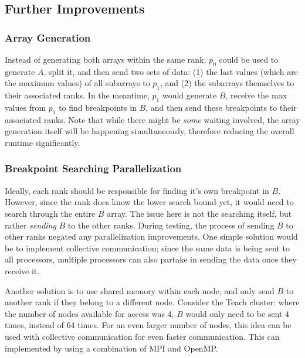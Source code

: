 \documentclass[12pt]{article}
\begin{document}
{    \subsection{Further Improvements}
    \subsubsection{Array Generation}
    Instead of generating both arrays within the same rank, $p_0$ could be used to generate $A$, split it, and then send two sets of data: (1) the last values (which are the maximum values) of all subarrays to $p_1$, and (2) the subarrays themselves to their associated ranks. In the meantime, $p_1$ would generate $B$, receive the max values from $p_1$ to find breakpoints in $B$, and then send these breakpoints to their associated ranks. Note that while there might be \emph{some} waiting involved, the array generation itself will be happening simultaneously, therefore reducing the overall runtime significantly.

    \subsubsection{Breakpoint Searching Parallelization}
    Ideally, each rank should be responsible for finding it's own breakpoint in $B$. However, since the rank does know the lower search bound yet, it would need to search through the entire $B$ array. The issue here is not the searching itself, but rather \emph{sending} $B$ to the other ranks. During testing, the process of sending $B$ to other ranks negated any parallelization improvements. One simple solution would be to implement collective communication; since the same data is being sent to all processors, multiple processors can also partake in sending the data once they receive it. 

    \noindent Another solution is to use shared memory within each node, and only send $B$ to another rank if they belong to a different node. Consider the Teach cluster: where the number of nodes available for access was 4, $B$ would only need to be sent 4 times, instead of 64 times. For an even larger number of nodes, this idea can be used with collective communication for even faster communication. This can implemented by using a combination of MPI and OpenMP.

}
\end{document}
